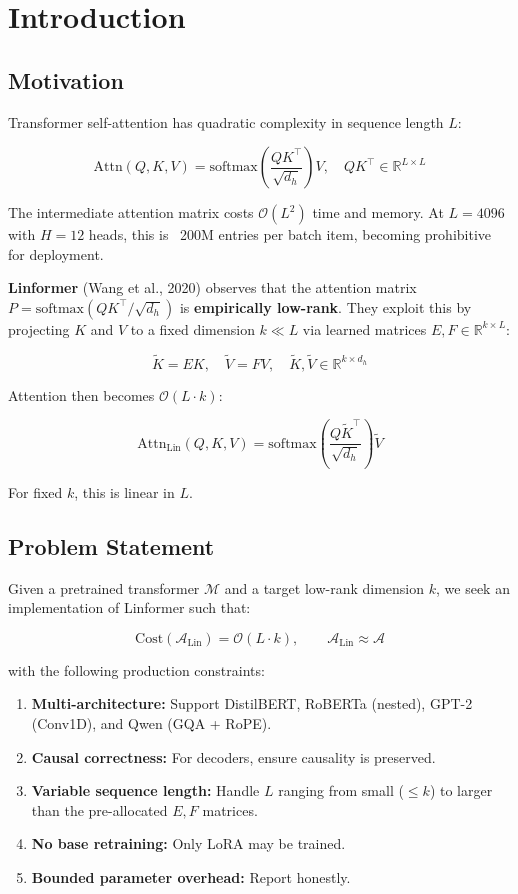 \section{Introduction}

\subsection{Motivation}

Transformer self-attention has quadratic complexity in sequence length $L$:

\[
\text{Attn}(Q, K, V) = \text{softmax}\!\left(\frac{Q K^\top}{\sqrt{d_h}}\right) V, 
\quad QK^\top \in \mathbb{R}^{L \times L}
\tag{1.1}
\]

The intermediate attention matrix costs $\mathcal{O}(L^2)$ time and memory. 
At $L = 4096$ with $H = 12$ heads, this is ~200M entries per batch item, 
becoming prohibitive for deployment.

\textbf{Linformer} (Wang et al., 2020) observes that the attention matrix 
$P = \text{softmax}(QK^\top/\sqrt{d_h})$ is \textbf{empirically low-rank}. They 
exploit this by projecting $K$ and $V$ to a fixed dimension $k \ll L$ via 
learned matrices $E, F \in \mathbb{R}^{k \times L}$:

\[
\tilde{K} = E K, \quad \tilde{V} = F V, \quad \tilde{K}, \tilde{V} \in \mathbb{R}^{k \times d_h}
\tag{1.2}
\]

Attention then becomes $\mathcal{O}(L \cdot k)$:

\[
\text{Attn}_\text{Lin}(Q, K, V) = \text{softmax}\!\left(\frac{Q \tilde{K}^\top}{\sqrt{d_h}}\right) \tilde{V}
\tag{1.3}
\]

For fixed $k$, this is linear in $L$.

\subsection{Problem Statement}

Given a pretrained transformer $\mathcal{M}$ and a target low-rank dimension 
$k$, we seek an implementation of Linformer such that:

\[
\text{Cost}(\mathcal{A}_\text{Lin}) = \mathcal{O}(L \cdot k), \qquad
\mathcal{A}_\text{Lin} \approx \mathcal{A}
\tag{1.4}
\]

with the following production constraints:

\begin{enumerate}
\item \textbf{Multi-architecture:} Support DistilBERT, RoBERTa (nested), GPT-2
  (Conv1D), and Qwen (GQA + RoPE).
\item \textbf{Causal correctness:} For decoders, ensure causality is preserved.
\item \textbf{Variable sequence length:} Handle $L$ ranging from small ($\le$$k$) to
  larger than the pre-allocated $E, F$ matrices.
\item \textbf{No base retraining:} Only LoRA may be trained.
\item \textbf{Bounded parameter overhead:} Report honestly.

\end{enumerate}
